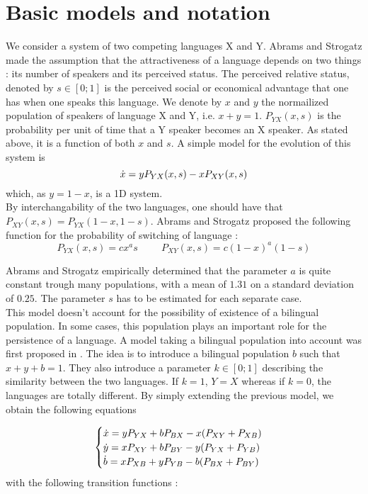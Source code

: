 \documentclass{article}
\begin{document}
\section{Basic models and notation}
\label{sec:basic}
We consider a system of two competing languages X and Y.
Abrams and Strogatz made the assumption that the attractiveness of a language depends on two things : its number of speakers and its perceived status.
The perceived relative status, denoted by $s \in [0;1]$ is the perceived social or economical advantage that one has when one speaks this language.
We denote by $x$ and $y$ the normailized population of speakers of language X and Y, i.e. $x+y=1$. $P_{YX}(x, s)$ is the probability per unit of time that a Y speaker becomes an X speaker. As stated above, it is a function of both $x$ and $s$.
A simple model for the evolution of this system is
$$\dot{x} = yP_{YX}(x, s) - xP_{XY}(x, s)$$
which, as $y = 1-x$, is a 1D system. \\
By interchangability of the two languages, one should have that $P_{XY}(x, s) = P_{YX}(1-x, 1-s)$. Abrams and Strogatz proposed the following function for the probability of switching of language :
\[ P_{YX}(x,s) = cx^as \hspace{1cm} P_{XY}(x,s) = c(1-x)^a(1-s) \]

Abrams and Strogatz empirically determined that the parameter $a$ is quite constant trough many populations, with a mean of $1.31$ on a standard deviation of $0.25$. The parameter $s$ has to be estimated for each separate case. \\

This model doesn't account for the possibility of existence of a bilingual population.
In some cases, this population plays an important role for the persistence of a language.
A model taking a bilingual population into account was first proposed in \cite{BAGGS19939}.
The idea is to introduce a bilingual population $b$ such that $x+y+b=1$.
They also introduce a parameter $k \in [0;1]$ describing the similarity between the two languages.
If $k = 1$, $Y = X$ whereas if $k = 0$, the languages are totally different.
By simply extending the previous model, we obtain the following equations

\begin{equation}
\label{eq:bil}
\begin{cases}
\dot{x} = yP_{YX} + bP_{BX} - x(P_{XY} + P_{XB}) \\
\dot{y} = xP_{XY} + bP_{BY} - y(P_{YX} + P_{YB}) \\
\dot{b} = xP_{XB} + yP_{YB} - b(P_{BX} + P_{BY}) \\
\end{cases}
\end{equation}
with the following transition functions :
\end{document}
